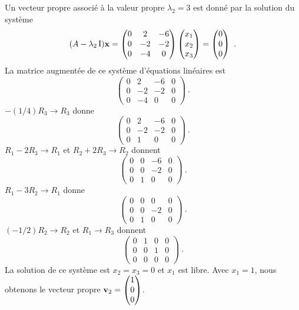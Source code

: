 {Un vecteur propre
associé à la valeur propre $\lambda_2 = 3$ est donné par la solution
du système
\[
(A-\lambda_2\operatorname{I})\mathbf{x} = 
\begin{pmatrix}
0 & 2 & -6 \\ 0 & -2 & -2 \\ 0 & -4 & 0
\end{pmatrix}
\begin{pmatrix} x_1 \\ x_2 \\ x_3 \end{pmatrix}
=
\begin{pmatrix} 0 \\ 0 \\ 0 \end{pmatrix} \ .
\]
La matrice augmentée de ce système d'équations linéaires est
\[
\left(\begin{array}{ccc|c}
0 & 2 & -6 & 0 \\ 0 & -2 & -2 & 0 \\ 0 & -4 & 0 & 0
\end{array}\right) \ .
\]
$-(1/4)R_3 \rightarrow R_3$ donne
\[
\left(\begin{array}{ccc|c}
0 & 2 & -6 & 0 \\ 0 & -2 & -2 & 0 \\ 0 & 1 & 0 & 0
\end{array}\right) \ .
\]
$R_1-2R_3 \rightarrow R_1$ et $R_2 +2R_3 \rightarrow R_2$ donnent
\[
\left(\begin{array}{ccc|c}
0 & 0 & -6 & 0 \\ 0 & 0 & -2 & 0 \\ 0 & 1 & 0 & 0
\end{array}\right) \ .
\]
$R_1-3R_2 \rightarrow R_1$ donne
\[
\left(\begin{array}{ccc|c}
0 & 0 & 0 & 0 \\ 0 & 0 & -2 & 0 \\ 0 & 1 & 0 & 0
\end{array}\right) \ .
\]
$(-1/2)R_2 \rightarrow R_2$ et $R_1 \rightarrow R_3$ donnent
\[
\left(\begin{array}{ccc|c}
0 & 1 & 0 & 0 \\ 0 & 0 & 1 & 0 \\ 0 & 0 & 0 & 0
\end{array}\right) \ .
\]
La solution de ce système est $x_2=x_3=0$ et $x_1$ est libre.  Avec
$x_1=1$, nous obtenons le vecteur propre $\displaystyle \mathbf{v}_2 =
\begin{pmatrix} 1 \\ 0 \\ 0 \end{pmatrix}$.

}
